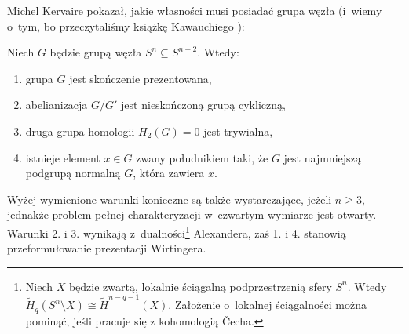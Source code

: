 Michel Kervaire \cite{kervaire1965} pokazał, jakie własności musi posiadać grupa węzła (i~wiemy o~tym, bo przeczytaliśmy książkę Kawauchiego \cite[tw. 14.1.1]{kawauchi1996}):
%

\begin{proposition}
%
%
    Niech $G$ będzie grupą węzła $S^n \subseteq S^{n+2}$.
    Wtedy:
    \begin{enumerate}
        \item grupa $G$ jest skończenie prezentowana,
        \item abelianizacja $G/G'$ jest nieskończoną grupą cykliczną,
        \item druga grupa homologii $H_2(G) = 0$ jest trywialna,
        \item istnieje element $x \in G$ zwany południkiem taki, że $G$ jest najmniejszą podgrupą normalną $G$, która zawiera $x$.
    \end{enumerate}
\end{proposition}

Wyżej wymienione warunki konieczne są także wystarczające, jeżeli $n \ge 3$, jednakże problem pełnej charakteryzacji w~czwartym wymiarze jest otwarty.
Warunki 2. i 3. wynikają z~dualności\footnote{Niech $X$ będzie zwartą, lokalnie ściągalną podprzestrzenią sfery $S^n$. Wtedy $\tilde {H}_{q}(S^n \setminus X) \cong \tilde H^{n-q-1}(X)$. Założenie o~lokalnej ściągalności można pominąć, jeśli pracuje się z kohomologią Čecha.} Alexandera, zaś 1. i 4. stanowią przeformułowanie prezentacji Wirtingera.

%

